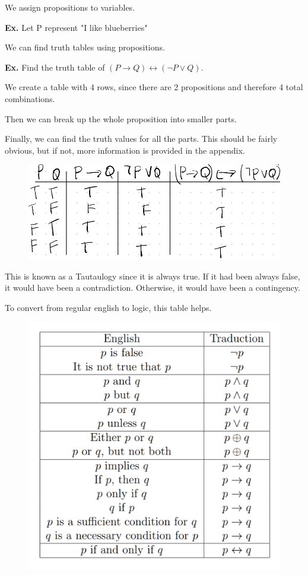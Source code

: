 \documentclass[12pt,letterpaper]{article} \usepackage{amsmath} \usepackage{graphicx}  \usepackage{longtable}  \usepackage{amssymb}
\begin{document}
        We assign propositions to variables. 

        \begin{mdframed}
            \textbf{Ex. }Let P represent "I like blueberries"
        \end{mdframed}

        We can find truth tables using propositions. 

        \begin{mdframed}
            \textbf{Ex. } Find the truth table of $(P\rightarrow Q) \leftrightarrow (\lnot P \lor Q)$.

            We create a table with 4 rows, since there are 2 propositions and therefore 4 total combinations. 

            Then we can break up the whole proposition into smaller parts. 

            Finally, we can find the truth values for all the parts. This should be fairly obvious, but if not, more information is provided in the appendix.

            \begin{figure}[H]
                \centering
                \includegraphics[width=0.5\linewidth]{ex1.png}
            \end{figure}

            This is known as a Tautaulogy since it is always true. If it had been always false, it would have been a contradiction. Otherwise, it would have been a contingency.
        \end{mdframed}

        To convert from regular english to logic, this table helps. 

        \begin{figure}[H]
            \centering
            \includegraphics[width=0.5\linewidth]{eng_to_logic.png}
        \end{figure}
\end{document}
